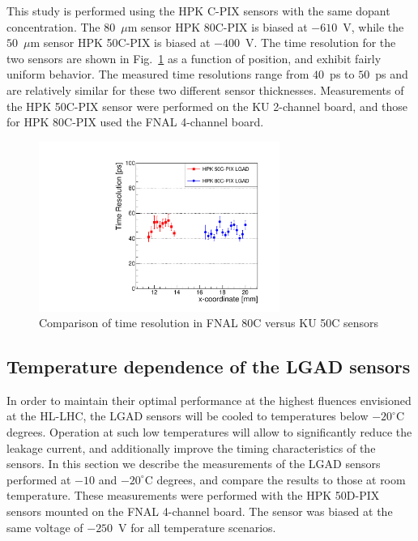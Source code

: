 \documentclass[preprint,1p]{elsarticle}
\begin{document}
This study is performed using the HPK C-PIX sensors with the same dopant concentration.
The $80$~$\mu$m sensor HPK 80C-PIX is biased at $-610$~V, while the $50$~$\mu$m sensor 
HPK 50C-PIX is biased at $-400$~V. The time resolution for the two sensors are shown
in Fig.~\ref{fig:HPK50CVs80C} as a function of position, and exhibit fairly uniform 
behavior. The measured time resolutions range from $40$~ps to $50$~ps and 
are relatively similar for these two different sensor
thicknesses. Measurements of the HPK 50C-PIX sensor were performed on the
KU 2-channel board, and those for HPK 80C-PIX used the FNAL 4-channel board.


\begin{figure}[htbp] 
\centering
\includegraphics[width=0.7\textwidth]{figs/FNAL_TimeResolution_vs_X_HPK50CVs80C.pdf} 
\caption{Comparison of time resolution in FNAL 80C versus KU 50C sensors } 
\label{fig:HPK50CVs80C} 
\end{figure} 


\subsection{Temperature dependence of the LGAD sensors}
\label{sec:temp_dependance}

In order to maintain their optimal performance at the highest fluences
envisioned at the HL-LHC, the LGAD sensors will be cooled to temperatures below
$-20^{\circ}$C degrees. Operation at such low temperatures will allow to
significantly reduce the leakage current, and additionally improve the timing
characteristics of the sensors. In this section we describe the measurements of
the LGAD sensors performed at $-10$ and $-20^{\circ}$C degrees, and compare the
results to those at room temperature. These measurements were performed with
the HPK 50D-PIX sensors mounted on the FNAL 4-channel board. The sensor was
biased at the same voltage of $-250$~V for all temperature scenarios.
\end{document}

